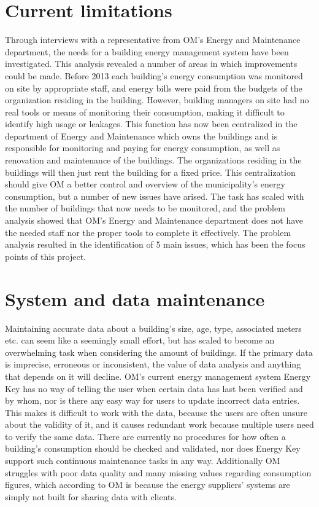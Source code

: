 \section{Current limitations}
Through interviews with a representative from OM’s Energy and Maintenance department, the needs for a building energy management system have been investigated. This analysis revealed a number of areas in which improvements could be made. Before 2013 each building's energy consumption was monitored on site by appropriate staff, and energy bills were paid from the budgets of the organization residing in the building. However, building managers on site had no real tools or means of monitoring their consumption, making it difficult to identify high usage or leakages. This function has now been centralized in the department of Energy and Maintenance which owns the buildings and is responsible for monitoring and paying for energy consumption, as well as renovation and maintenance of the buildings. The organizations residing in the buildings will then just rent the building for a fixed price. This centralization should give OM a better control and overview of the municipality’s energy consumption, but a number of new issues have arised. The task has scaled with the number of buildings that now needs to be monitored, and the problem analysis showed that OM’s Energy and Maintenance department does not have the needed staff nor the proper tools to complete it effectively. The problem analysis resulted in the identification of 5 main issues, which has been the focus points of this project.
\section*{System and data maintenance}
Maintaining accurate data about a building's size, age, type, associated meters etc. can seem like a seemingly small effort, but has scaled to become an overwhelming task when considering the amount of buildings. If the primary data is imprecise, erroneous or inconsistent, the value of data analysis and anything that depends on it will decline. OM’s current energy management system Energy Key has no way of telling the user when certain data has last been verified and by whom, nor is there any easy way for users to update incorrect data entries. This makes it difficult to work with the data, because the users are often unsure about the validity of it, and it causes redundant work because multiple users need to verify the same data. There are currently no procedures for how often a building's consumption should be checked and validated, nor does Energy Key support such continuous maintenance tasks in any way. Additionally OM struggles with poor data quality and many missing values regarding consumption figures, which according to OM is because the energy suppliers’ systems are simply not built for sharing data with clients.
